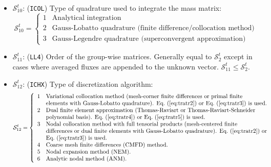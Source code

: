 \begin{itemize}
\item $\mathcal{S}^{t}_{10}$: ({\tt ICOL}) Type of quadrature used to integrate
the mass matrix:
\begin{displaymath}
\mathcal{S}^{t}_{10} = \left\{
\begin{array}{rl}
 1 & \textrm{Analytical integration} \\
 2 & \textrm{Gauss-Lobatto quadrature (finite difference/collocation method)} \\
 3 & \textrm{Gauss-Legendre quadrature (superconvergent approximation)}
\end{array} \right.
\end{displaymath}

\item $\mathcal{S}^{t}_{11}$: ({\tt LL4}) Order of the group-wise matrices.
Generally equal to
$\mathcal{S}^{t}_{2}$ except in cases where averaged fluxes are appended to the
unknown vector. $\mathcal{S}^{t}_{11}\le\mathcal{S}^{t}_{2}$.

\item $\mathcal{S}^{t}_{12}$: ({\tt ICHX}) Type of discretization algorithm:
\begin{displaymath}
\mathcal{S}^{t}_{12} = \left\{
\begin{array}{rl}
 1 & \textrm{Variational collocation method (mesh-corner finite differences or primal finite} \\
   & \textrm{elements with Gauss-Lobatto quadrature). \Eq{tratr2} or \Eq{tratr3} is used.} \\
 2 & \textrm{Dual finite element approximation (Thomas-Raviart or Thomas-Raviart-Schneider} \\
   & \textrm{polynomial basis). \Eq{tratr4} or \Eq{tratr5} is used.} \\
 3 & \textrm{Nodal collocation method with full tensorial products (mesh-centered finite} \\
   & \textrm{differences or dual finite elements with Gauss-Lobatto quadrature). \Eq{tratr2} or} \\
   & \textrm{\Eq{tratr3} is used.} \\
 4 & \textrm{Coarse mesh finite differences (CMFD) method.} \\
 5 & \textrm{Nodal expansion method (NEM).} \\
 6 & \textrm{Analytic nodal method (ANM).}
\end{array} \right.
\end{displaymath}


\end{itemize}
